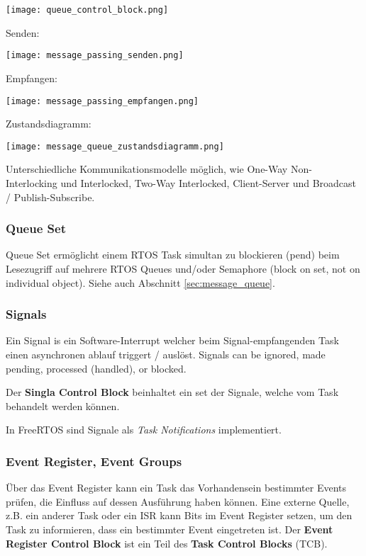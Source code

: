 \texttt{[image: queue\_control\_block.png]}

Senden:

\texttt{[image: message\_passing\_senden.png]}

Empfangen:

\texttt{[image: message\_passing\_empfangen.png]}

Zustandsdiagramm:

\texttt{[image: message\_queue\_zustandsdiagramm.png]}

Unterschiedliche Kommunikationsmodelle möglich, wie One-Way Non-Interlocking und Interlocked, Two-Way Interlocked, Client-Server und Broadcast / Publish-Subscribe.


\subsubsection{Queue Set}

Queue Set ermöglicht einem RTOS Task simultan zu blockieren (pend) beim Lesezugriff auf
mehrere RTOS Queues und/oder Semaphore (block on set, not on individual object).
Siehe auch Abschnitt \ref{sec:message_queue}.


\subsubsection{Signals}

Ein Signal is ein Software-Interrupt welcher beim Signal-empfangenden Task einen asynchronen ablauf triggert / auslöst.
Signals can be ignored, made pending, processed (handled), or blocked.

Der \textbf{Singla Control Block} beinhaltet ein set der Signale, welche vom Task behandelt werden können.

In FreeRTOS sind Signale als \textit{Task Notifications} implementiert.


\subsubsection{Event Register, Event Groups}

Über das Event Register kann ein Task das Vorhandensein bestimmter Events prüfen,
die Einfluss auf dessen Ausführung haben können.
Eine externe Quelle, z.B. ein anderer Task oder ein ISR kann Bits im Event Register setzen,
um den Task zu informieren, dass ein bestimmter Event eingetreten ist.
Der \textbf{Event Register Control Block} ist ein Teil des \textbf{Task Control Blocks} (TCB).


